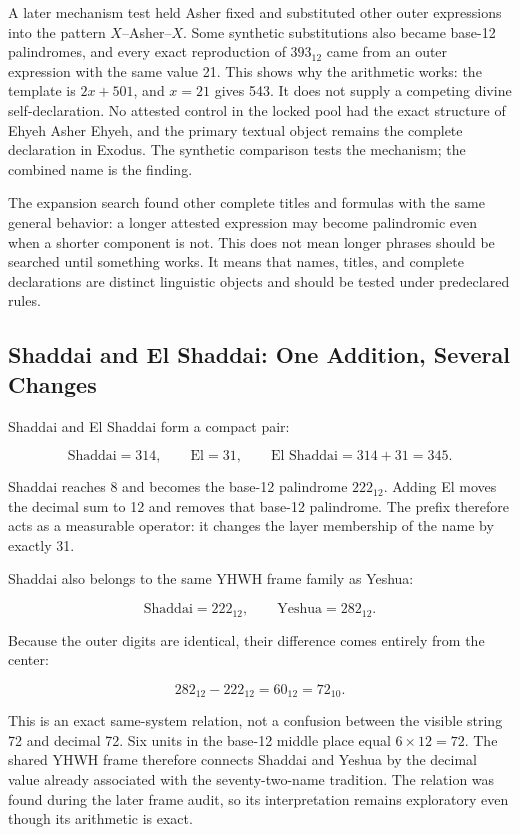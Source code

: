 A later mechanism test held Asher fixed and substituted other outer expressions into the pattern $X$--Asher--$X$. Some synthetic substitutions also became base-12 palindromes, and every exact reproduction of $393_{12}$ came from an outer expression with the same value 21. This shows why the arithmetic works: the template is $2x+501$, and $x=21$ gives 543. It does not supply a competing divine self-declaration. No attested control in the locked pool had the exact structure of Ehyeh Asher Ehyeh, and the primary textual object remains the complete declaration in Exodus. The synthetic comparison tests the mechanism; the combined name is the finding.

The expansion search found other complete titles and formulas with the same general behavior: a longer attested expression may become palindromic even when a shorter component is not. This does not mean longer phrases should be searched until something works. It means that names, titles, and complete declarations are distinct linguistic objects and should be tested under predeclared rules.

\subsection{Shaddai and El Shaddai: One Addition, Several Changes}

Shaddai and El Shaddai form a compact pair:

\[
\text{Shaddai}=314,
\qquad
\text{El}=31,
\qquad
\text{El Shaddai}=314+31=345.
\]

Shaddai reaches 8 and becomes the base-12 palindrome $222_{12}$. Adding El moves the decimal sum to 12 and removes that base-12 palindrome. The prefix therefore acts as a measurable operator: it changes the layer membership of the name by exactly 31.

Shaddai also belongs to the same YHWH frame family as Yeshua:

\[
\text{Shaddai}=2\boxed{2}2_{12},
\qquad
\text{Yeshua}=2\boxed{8}2_{12}.
\]

Because the outer digits are identical, their difference comes entirely from the center:

\[
282_{12}-222_{12}=60_{12}=72_{10}.
\]

This is an exact same-system relation, not a confusion between the visible string 72 and decimal 72. Six units in the base-12 middle place equal $6\times12=72$. The shared YHWH frame therefore connects Shaddai and Yeshua by the decimal value already associated with the seventy-two-name tradition. The relation was found during the later frame audit, so its interpretation remains exploratory even though its arithmetic is exact.

